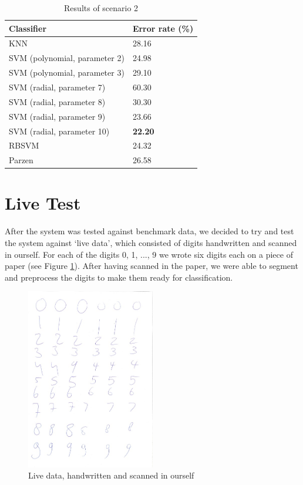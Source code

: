 \documentclass[11pt,twoside,a4paper]{article}
\begin{document}
\begin{table}[h]
\centering
    \begin{tabular}{ll}
    Classifier                    & Error rate (\%) \\ \hline
    KNN                           & 28.16 \\
    SVM (polynomial, parameter 2) & 24.98           \\
    SVM (polynomial, parameter 3) & 29.10           \\
    SVM (radial, parameter 7)     & 60.30           \\
    SVM (radial, parameter 8)     & 30.30           \\
    SVM (radial, parameter 9)     & 23.66           \\
    SVM (radial, parameter 10)    & \bf{22.20}           \\
    RBSVM                         & 24.32           \\
    Parzen                        & 26.58           \\
    \end{tabular}
    \caption{Results of scenario 2}
    \label{table:scenario2}
\end{table}



\section{Live Test}
After the system was tested against benchmark data, we decided to try and test the system against `live data', which consisted of digits handwritten and scanned in ourself. For each of the digits 0, 1, ..., 9 we wrote six digits each on a piece of paper (see Figure \ref{img:livedata}). After having scanned in the paper, we were able to segment and preprocess the digits to make them ready for classification.

\begin{figure}[h]
  \centering
  \captionsetup{justification=centering}
  \includegraphics[width=0.5\textwidth]{livedata.jpeg}
  \caption{Live data, handwritten and scanned in ourself}
  \label{img:livedata}
\end{figure}
\end{document}
